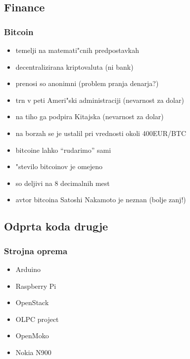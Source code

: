 \documentclass{beamer}
\begin{document}
\subsection{Finance}
\begin{frame}
\frametitle{Bitcoin}
\begin{itemize}
\item temelji na matemati"cnih predpostavkah
\item decentralizirana kriptovaluta (ni bank)
\item prenosi so anonimni (problem pranja denarja?)
\item trn v peti Ameri"ski administraciji (nevarnost za dolar)
\item na tiho ga podpira Kitajska (nevarnost za dolar)
\item na borzah se je ustalil pri vrednosti okoli 400EUR/BTC
\item bitcoine lahko ``rudarimo'' sami
\item "stevilo bitcoinov je omejeno
\item so deljivi na 8 decimalnih mest
\item avtor bitcoina Satoshi Nakamoto je neznan (bolje zanj!)
\end{itemize}
\end{frame}



\subsection{Odprta koda drugje}
\begin{frame}
\frametitle{Strojna oprema}
\begin{itemize}
\item Arduino
\item Raspberry Pi
\item OpenStack
\item OLPC project
\item OpenMoko
\item Nokia N900
\end{itemize}
\end{frame}
\end{document}
